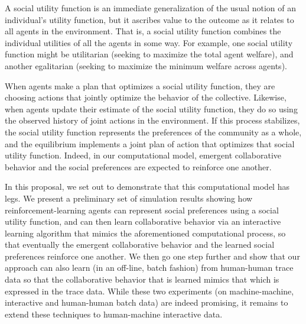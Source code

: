 A social utility function is an immediate generalization of the usual
notion of an individual's utility function, but it ascribes value to
the outcome as it relates to all agents in the environment.  That is,
a social utility function combines the individual utilities of all the
agents in some way.  For example, one social utility function might be
utilitarian (seeking to maximize the total agent welfare), and another
egalitarian (seeking to maximize the minimum welfare across agents).

When agents make a plan that optimizes a social utility function, they
are choosing actions that jointly optimize the behavior of the
collective.
Likewise, when
agents update their estimate of the social utility function, they do
so using the observed history of joint actions in the environment.
If this process stabilizes, the social utility function represents the
preferences of the community as a whole, and the equilibrium
implements a joint plan of action that optimizes that social utility
function.  Indeed, in our computational model, emergent collaborative
behavior and the social preferences are expected to reinforce one
another.

In this proposal, we set out to demonstrate that this computational
model has legs.  We present a preliminary set of simulation results
showing how reinforcement-learning agents 
can represent social preferences using a social utility function, and
can then learn collaborative behavior via an interactive learning
algorithm that mimics the aforementioned computational process, so
that eventually the emergent collaborative behavior and the learned
social preferences reinforce one another.  We then go one step further
and show that our approach can also learn (in an off-line, batch
fashion) from human-human trace data so that the collaborative
behavior that is learned mimics that which is expressed in the trace
data.  While these two experiments (on machine-machine, interactive
and human-human batch data) are indeed promising, it remains to extend
these techniques to human-machine interactive data.

